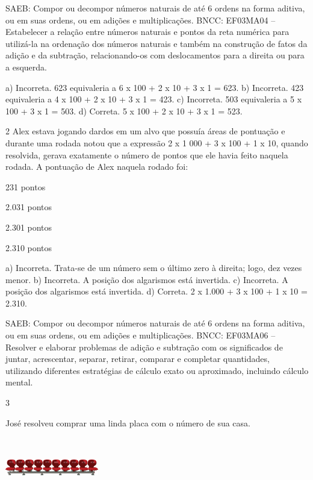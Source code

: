 \begin{multicols}{2}
{\begin{escolha}
{SAEB: Compor ou decompor números naturais de até 6 ordens na forma aditiva, ou em suas ordens, ou em adições e multiplicações.
BNCC: EF03MA04 -- Estabelecer a relação entre números naturais e pontos da reta numérica para
utilizá-la na ordenação dos números naturais e também na construção de fatos da adição e da
subtração, relacionando-os com deslocamentos para a direita ou para a esquerda.

a) Incorreta. 623 equivaleria a 6 x 100 + 2 x 10 + 3 x 1 = 623.
b) Incorreta. 423 equivaleria a 4 x 100 + 2 x 10 + 3 x 1 = 423.
c) Incorreta. 503 equivaleria a 5 x 100 + 3 x 1 = 503.
d) Correta. 5 x 100 + 2 x 10 + 3 x 1 = 523.

\num{2} Alex estava jogando dardos em um alvo que possuía áreas de pontuação e
durante uma rodada notou que a expressão 2 x 1 000 + 3 x 100 + 1 x 10,
quando resolvida, gerava exatamente o número de pontos que ele havia
feito naquela rodada. A pontuação de Alex naquela rodado foi:

\begin{escolha}
\item
  231 pontos
\item
  2.031 pontos
\item
  2.301 pontos
\item
  2.310 pontos
\end{escolha}

a) Incorreta. Trata-se de um número sem o último zero à direita; logo, dez vezes menor.
b) Incorreta. A posição dos algarismos está invertida.
c) Incorreta. A posição dos algarismos está invertida.
d) Correta. 2 x 1.000 + 3 x 100 + 1 x 10 = 2.310.


SAEB: Compor ou decompor números naturais de até 6 ordens na
forma aditiva, ou em suas ordens, ou em adições e multiplicações.
BNCC: EF03MA06 – Resolver e elaborar problemas de adição e subtração com os significados de
juntar, acrescentar, separar, retirar, comparar e completar quantidades, utilizando diferentes
estratégias de cálculo exato ou aproximado, incluindo cálculo mental.


\num{3}

José resolveu comprar uma linda placa com o número de sua casa.

\includegraphics[width=1.60256in,height=1.03072in]{media/image107.png}

}
\end{escolha}}
\end{multicols}
